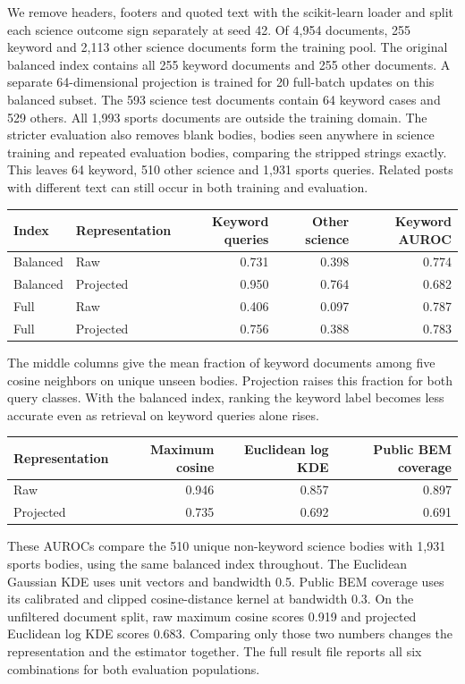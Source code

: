We remove headers, footers and quoted text with the scikit-learn loader and
split each science outcome sign separately at seed 42. Of 4,954 documents,
255 keyword and 2,113 other science documents form the training pool. The
original balanced index contains all 255 keyword documents and 255 other
documents. A separate 64-dimensional projection is trained for 20 full-batch
updates on this balanced subset. The 593 science test documents contain 64
keyword cases and 529 others. All 1,993 sports documents are outside the
training domain. The stricter evaluation also removes blank bodies, bodies
seen anywhere in science training and repeated evaluation bodies, comparing
the stripped strings exactly. This leaves 64 keyword, 510 other science and
1,931 sports queries. Related posts with different text can still occur in
both training and evaluation.

\begin{center}
\small
\begin{tabular}{llrrr}
\toprule
Index & Representation & Keyword queries & Other science & Keyword AUROC \\
\midrule
Balanced & Raw       & 0.731 & 0.398 & 0.774 \\
Balanced & Projected & 0.950 & 0.764 & 0.682 \\
Full     & Raw       & 0.406 & 0.097 & 0.787 \\
Full     & Projected & 0.756 & 0.388 & 0.783 \\
\bottomrule
\end{tabular}
\end{center}

The middle columns give the mean fraction of keyword documents among five
cosine neighbors on unique unseen bodies. Projection raises this fraction
for both query classes. With the balanced index, ranking the keyword label
becomes less accurate even as retrieval on keyword queries alone rises.

\begin{center}
\small
\begin{tabular}{lrrr}
\toprule
Representation & Maximum cosine & Euclidean log KDE & Public BEM coverage \\
\midrule
Raw       & 0.946 & 0.857 & 0.897 \\
Projected & 0.735 & 0.692 & 0.691 \\
\bottomrule
\end{tabular}
\end{center}

These AUROCs compare the 510 unique non-keyword science bodies with 1,931
sports bodies, using the same balanced index throughout. The Euclidean
Gaussian KDE uses unit vectors and bandwidth 0.5. Public BEM coverage uses
its calibrated and clipped cosine-distance kernel at bandwidth 0.3.
On the unfiltered document split, raw maximum cosine scores 0.919 and
projected Euclidean log KDE scores 0.683. Comparing only those two numbers
changes the representation and the estimator together. The full result file
reports all six combinations for both evaluation populations.

